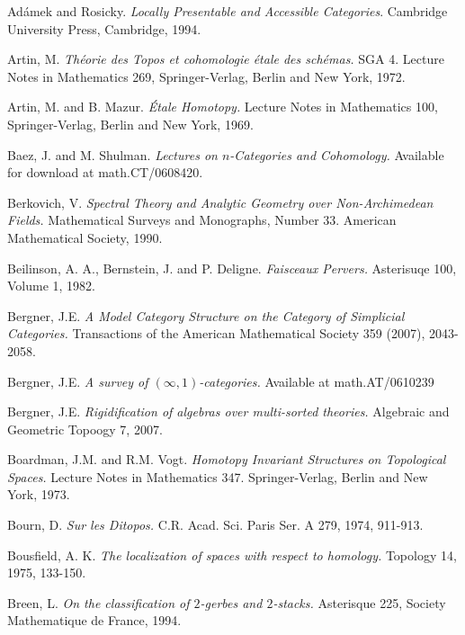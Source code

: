 \documentclass{report}[10pt, final]
\theoremstyle{definition}
\begin{document}
\begin{EndMatter}


\begin{thebibliography}{99}


 Ad\'{a}mek and Rosicky. {\it Locally Presentable
and Accessible Categories}. Cambridge University Press, Cambridge,
1994.

 Artin, M. {\it Th\'{e}orie des Topos et cohomologie
\'{e}tale des sch\'{e}mas.} SGA 4. Lecture Notes in Mathematics
269, Springer-Verlag, Berlin and New York, 1972.

 Artin, M. and B. Mazur. {\it \'{E}tale Homotopy.} Lecture Notes in Mathematics 100, Springer-Verlag, Berlin and New York, 1969.

 Baez, J. and M. Shulman. {\it Lectures on $n$-Categories and Cohomology.} Available for download at math.CT/0608420.

 Berkovich, V. {\it Spectral Theory and Analytic Geometry over Non-Archimedean Fields.} Mathematical Surveys and Monographs, Number 33. American Mathematical Society, 1990.

 Beilinson, A. A., Bernstein, J. and P. Deligne.
{\it Faisceaux Pervers.} Asterisuqe 100, Volume 1, 1982.

 Bergner, J.E. {\it A Model Category Structure on the Category of Simplicial Categories.} Transactions of the American Mathematical Society 359 (2007), 2043-2058.

 Bergner, J.E. {\it A survey of $(\infty,1)$-categories.} Available at math.AT/0610239

 Bergner, J.E. {\it Rigidification of algebras over multi-sorted theories.}
Algebraic and Geometric Topoogy 7, 2007.

 Boardman, J.M. and R.M. Vogt. {\it Homotopy
Invariant Structures on Topological Spaces.} Lecture Notes in
Mathematics 347. Springer-Verlag, Berlin and New York, 1973.

 Bourn, D. {\it Sur les Ditopos.} C.R. Acad.
Sci. Paris Ser. A 279, 1974, 911-913.

 Bousfield, A. K. {\it The localization of spaces
with respect to homology.} Topology 14, 1975, 133-150.

 Breen, L. {\it On the classification of $2$-gerbes and $2$-stacks.} Asterisque 225, Society Mathematique de France, 1994.


\end{thebibliography}
\end{EndMatter}
\end{document}
